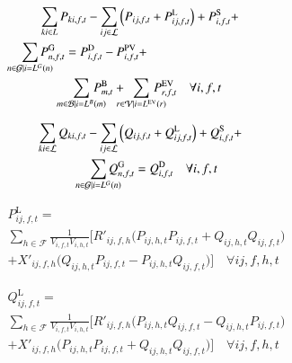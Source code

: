 \documentclass[preprint, 10pt, 5p]{elsarticle}
\begin{document}
\vspace{-10pt}
\begin{multline}\label{P_flow}
    \hspace{-10pt}\sum_{ki\in {L}} P_{ki,f,t} 
    - \sum_{ij\in \mathcal{L}} \Big(P_{ij,f,t} + P^{\text{L}}_{ij,f,t} \Big) + 
    P^\text{S}_{i,f,t} + \\ 
    \hspace{-110pt}\sum_{n\in \mathcal{G} |i=L^G(n)}\!\!\!\!\!\!\! 
    P^{\text{G}}_{n,f,t}
    = P^\text{D}_{i,f,t} - P^\text{PV}_{i,f,t} +\\ \!\!\!\!\!\!\!
    \sum_{m\in \mathcal{B} |i=L^B(m)}\!\!\!\!\!\!\! P^{\text{B}}_{m,t} + 
    \!\!\!\!\!\sum_{r\in \mathcal{V} |i=L^{\text{EV}}(r)}\!\!\!\!\!\!\! 
    P^{\text{\text{EV}}}_{r,f,t}
    \quad  \forall i,f,t
\end{multline}
\vspace{-25pt}

\begin{multline}\label{Q_flow}
    \hspace{-10pt}\sum_{ki\in \mathcal{L}} Q_{ki,f,t} - 
    \sum_{ij\in \mathcal{L}} \Big(Q_{ij,f,t} + Q^{\text{L}}_{ij,f,t} \Big) + 
    Q^\text{S}_{i,f,t} + \\
    \sum_{n\in \mathcal{G} |i=L^G(n)}\!\!\!\!\!\!\! Q^{\text{G}}_{n,f,t} = 
    Q^\text{D}_{i,f,t}  \quad \forall i,f,t
\end{multline}
\vspace{-35pt}
  
\begin{multline}\label{P_losses}
    P^{\text{L}}_{ij,f,t} = \\
        \sum_{h \in \mathcal{F}} 
        \frac{1}{V_{i,f,t}V_{i,h,t}}\bigg[ R'_{ij,f,h}\Big(P_{ij,h,t}P_{ij,f,t}  
    + Q_{ij,h,t}Q_{ij,f,t}\Big)\\ + X'_{ij,f,h} \Big( Q_{ij,h,t}P_{ij,f,t} 
    - P_{ij,h,t}Q_{ij,f,t}\Big) \bigg] \quad \forall ij,f,h,t
\end{multline}
\vspace{-35pt}
        
\begin{multline}\label{Q_losses}
    Q^{\text{L}}_{ij,f,t} = \\
        \sum_{h \in \mathcal{F}} 
        \frac{1}{V_{i,f,t}V_{i,h,t}}\bigg[ R'_{ij,f,h}\Big(P_{ij,h,t}Q_{ij,f,t} 
    - Q_{ij,h,t}P_{ij,f,t}\Big) \\ 
    + X'_{ij,f,h} \Big( P_{ij,h,t}P_{ij,f,t} 
    + Q_{ij,h,t}Q_{ij,f,t}\Big)  \bigg] \quad \forall ij,f,h,t
\end{multline}
\vspace{-35pt}
\end{document}
